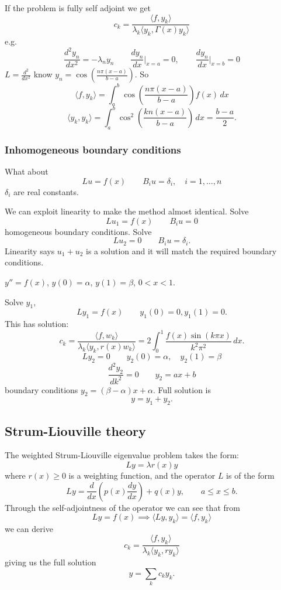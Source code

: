 \documentclass[10pt, a4paper]{article}
\begin{document}
If the problem is fully self adjoint we get
\[
c_k = \frac{\langle f, y_k\rangle}{\lambda_k \langle y_k, \Gamma(x)y_k\rangle}
\]
e.g.
\[
\frac{d ^ 2y_n}{dx ^ 2} = -\lambda_ny_n\qquad \frac{dy_n}{dx}\biggr|_{x = a} = 0,\qquad \frac{dy_n}{dx}\biggr|_{x = b} = 0
\]
$L = \frac{d ^ 2}{dx ^ 2}$ know $y_n = \cos\left(\frac{n\pi(x - a)}{b - a}\right)$.
So
\[
\langle f, y_k \rangle = \int_{a}^{b}\cos\left(\frac{n\pi(x - a)}{b - a}\right)f(x)\,dx
\]
\[
\langle y_k, y_k\rangle = \int_{a}^{b}\cos ^ 2\left(\frac{kn(x - a)}{b - a}\right)\,dx = \frac{b - a}{2}.
\]

\subsubsection{Inhomogeneous boundary conditions}
What about
\[
Lu = f(x)\qquad B_iu = \delta_i,\quad i = 1, \dotsc, n
\]
$\delta_i$ are real constants.

We can exploit linearity to make the method almost identical.
Solve
\[
Lu_1 = f(x)\qquad B_iu = 0
\]
homogeneous boundary conditions.
Solve
\[
Lu_2 = 0\qquad B_iu = \delta_i.
\]
Linearity says $u_1 + u_2$ is a solution and it will match the required boundary conditions.

\begin{example}
    $y'' = f(x)$,
    $y(0) = \alpha$,
    $y(1) = \beta$,
    $0 < x < 1$.

    Solve $y_1$,
    \[
    Ly_1 = f(x)\qquad y_1(0) = 0, y_1(1) = 0.
    \]
    This has solution:
    \[
    c_k = \frac{\langle f, w_k\rangle}{\lambda_k\langle y_k, r(x)w_k\rangle} = 2\int_{0}^{1}\frac{f(x)\sin(k\pi x)}{k ^ 2\pi ^ 2}\,dx.
    \]
    \[
    Ly_2 = 0\qquad y_2(0) = \alpha,\quad y_2(1) = \beta
    \]
    \[
    \frac{d ^ 2y_2}{dk ^ 2} = 0\qquad y_2 = ax + b
    \]
    boundary conditions
    $y_2 = (\beta - \alpha)x + \alpha$.
    Full solution is
    \[
    y = y_1 + y_2.
    \]
\end{example}

\newpage

\subsection{Strum-Liouville theory}

The weighted Strum-Liouville eigenvalue problem takes the form:
\[
Ly = \lambda r(x)y
\]
where $r(x) \geq 0$ is a weighting function,
and the operator $L$ is of the form
\[
Ly = \frac{d}{dx}\left(p(x)\frac{dy}{dx}\right) + q(x)y,\qquad a \leq x \leq b.
\]
Through the self-adjointness of the operator we can see that from
\[
Ly = f(x) \implies \langle Ly, y_k\rangle = \langle f, y_k\rangle
\]
we can derive
\[
c_k = \frac{\langle f, y_k\rangle}{\lambda_k\langle y_k, ry_k\rangle}
\]
giving us the full solution
\[
y = \sum_{k}c_ky_k.
\]
\end{document}
